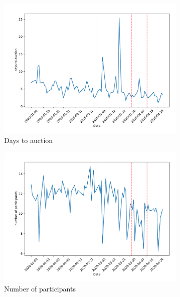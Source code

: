 \documentclass[11pt,a4paper]{article}
\begin{document}
\begin{figure}[h]
  \centering
  \begin{subfigure}[b]{0.49\textwidth}
      \includegraphics[width=0.998\textwidth]{../results/figures/DaysToAuction_mean_mat30_loan1_timeseries_nr_1_7.pdf}
      \caption{Days to auction}
     \end{subfigure}
     \begin{subfigure}[b]{0.49\textwidth}
      \includegraphics[width=0.998\textwidth]{../results/figures/Number of Participants_mean_mat30_loan1_timeseries_nr_1_7.pdf}
      \caption{ Number of participants}
     \end{subfigure}
     \begin{subfigure}[b]{0.49\textwidth}

\end{subfigure}
\end{figure}
\end{document}
